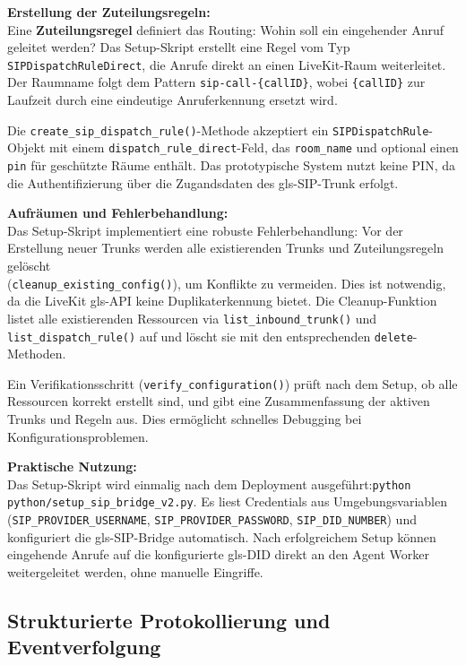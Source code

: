 \textbf{Erstellung der Zuteilungsregeln:}\\
Eine \textbf{Zuteilungsregel} definiert das Routing: Wohin soll ein eingehender Anruf geleitet werden? Das Setup-Skript erstellt eine Regel vom Typ \texttt{SIPDispatchRuleDirect}, die Anrufe direkt an einen LiveKit-Raum weiterleitet. Der Raumname folgt dem Pattern \texttt{sip-call-\{callID\}}, wobei \texttt{\{callID\}} zur Laufzeit durch eine eindeutige Anruferkennung ersetzt wird.

Die \texttt{create\_sip\_dispatch\_rule()}-Methode akzeptiert ein \texttt{SIPDispatchRule}-Objekt mit einem \texttt{dispatch\_rule\_direct}-Feld, das \texttt{room\_name} und optional einen \texttt{pin} für geschützte Räume enthält. Das prototypische System nutzt keine PIN, da die Authentifizierung über die Zugandsdaten des \gls{gls-SIP}-Trunk erfolgt.

\textbf{Aufräumen und Fehlerbehandlung:}\\
Das Setup-Skript implementiert eine robuste Fehlerbehandlung: Vor der Erstellung neuer Trunks werden alle existierenden Trunks und Zuteilungsregeln gelöscht\\ (\texttt{cleanup\_existing\_config()}), um Konflikte zu vermeiden. Dies ist notwendig, da die LiveKit \gls{gls-API} keine Duplikaterkennung bietet. Die Cleanup-Funktion listet alle existierenden Ressourcen via \texttt{list\_inbound\_trunk()} und \texttt{list\_dispatch\_rule()} auf und löscht sie mit den entsprechenden \texttt{delete}-Methoden.

Ein Verifikationsschritt (\texttt{verify\_configuration()}) prüft nach dem Setup, ob alle Ressourcen korrekt erstellt sind, und gibt eine Zusammenfassung der aktiven Trunks und Regeln aus. Dies ermöglicht schnelles Debugging bei Konfigurationsproblemen.

\textbf{Praktische Nutzung:}\\
Das Setup-Skript wird einmalig nach dem Deployment ausgeführt:\newline \texttt{python python/setup\_sip\_bridge\_v2.py}. Es liest Credentials aus Umgebungsvariablen (\texttt{SIP\_PROVIDER\_USERNAME}, \texttt{SIP\_PROVIDER\_PASSWORD}, \texttt{SIP\_DID\_NUMBER}) und konfiguriert die \gls{gls-SIP}-Bridge automatisch. Nach erfolgreichem Setup können eingehende Anrufe auf die konfigurierte \gls{gls-DID} direkt an den Agent Worker weitergeleitet werden, ohne manuelle Eingriffe.

\subsection{Strukturierte Protokollierung und Eventverfolgung}

